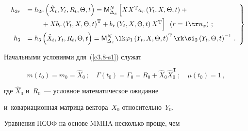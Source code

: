 \begin{equation}

    \left.

    \begin{array}{rl}

       h_{2r}&=h_{2r} \left(\hat X_t, Y_t, R_t, \Theta, t \right)=

     {\sf M}_{\Delta_x}^N \left[ 

     \vphantom{\left(Y_t,X,\Theta, t\right)^{\mathrm{T}}}

     XX^{\mathrm{T}} a_r \left(Y_t,X,\Theta, t\right)+{}\right.\\[6pt]

&     \left.\hspace*{7mm}{}+

     X b_r\left(Y_t,X,\Theta, t\right)^{\mathrm{T}} + b_r

\left(Y_t,X,\Theta, t\right) X^{\mathrm{T}}\right] \enskip \left(r=1\tr n_x\right)\,;

\\[6pt]

    h_3& =h_3 \left(\hat X_t, Y_t, R_t, \Theta, t \right)=

    {\sf M}_{\Delta_x}^N \lk\varphi_1\left(Y_t,X,\Theta, t\right)^{\mathrm{T}} \rk 

    \si_2\left(Y_t,\Theta, t\right)^{-1}\,.

    \end{array}

    \right\}

    \label{e3.12-s1}

    \end{equation}



Начальными условиями для~(\ref{e3.8-s1}) служат

\begin{equation}

m(t_0) = m_0 =\hat X_0\,;\quad \Gamma (t_0) =\Gamma_0 =

    R_0 +\hat X_0\hat X_0^{\mathrm{T}}\,;\quad \mu(t_0)=1\,,

    \label{e3.13-s1}

    \end{equation}

где  $\hat X_0$ и~$R_0$~--- условное математическое ожидание 

и~ковариационная матрица вектора~$X_0$ относительно~$Y_0$.



Уравнения НСОФ на основе MMHA несколько проще, чем 

